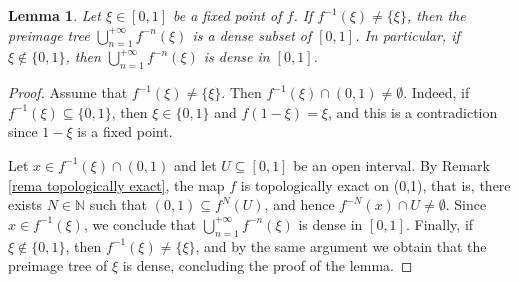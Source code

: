 \documentclass[10pt,a4paper]{amsart}
\numberwithin{equation}{section} %
\numberwithin{figure}{section} %
\newtheorem{lemm}[prop]{Lemma}
\newcommand{\N}{\mathbb{N}}
\renewcommand{\=}{\coloneqq}
\begin{document}
      \begin{lemm}\label{l: dense preimage tree}
          Let $\xi \in[0,1]$ be a fixed point of $f$. If $f^{-1}(\xi) \neq \{\xi\}$, then the preimage tree $\bigcup_{n=1}^{+\infty}f^{-n}(\xi)$ is a dense subset of $[0,1]$. In particular, if $\xi \not\in\{0,1\}$, then $\bigcup_{n=1}^{+\infty}f^{-n}(\xi)$ is dense in $[0,1]$.
      \end{lemm}
      \begin{proof}
        Assume that $f^{-1}(\xi) \neq \{\xi\}$. Then $f^{-1}(\xi)\cap(0,1)\neq \emptyset$. Indeed, if $f^{-1}(\xi) \subseteq \{0,1\}$, then $\xi \in\{0,1\}$ and $f(1-\xi)=\xi$, and this is a contradiction since $1-\xi$ is a fixed point.

        Let $x\in f^{-1}(\xi)\cap (0,1)$ and let $U\subseteq [0,1]$ be an open interval. By Remark \ref{rema topologically exact}, the map $f$ is topologically exact on (0,1), that is, there exists $N\in\N$ such that $(0,1) \subseteq f^{N}(U)$, and hence $f^{-N}(x)\cap U \neq \emptyset$. Since $x\in f^{-1}(\xi)$, we conclude that $\bigcup_{n=1}^{+\infty}f^{-n}(\xi)$ is dense in $[0,1]$. Finally, if $\xi \not\in \{0,1\}$, then $f^{-1}(\xi)\neq \{\xi\}$, and by the same argument we obtain that the preimage tree of $\xi$ is dense, concluding the proof of the lemma.
      \end{proof}
\end{document}
